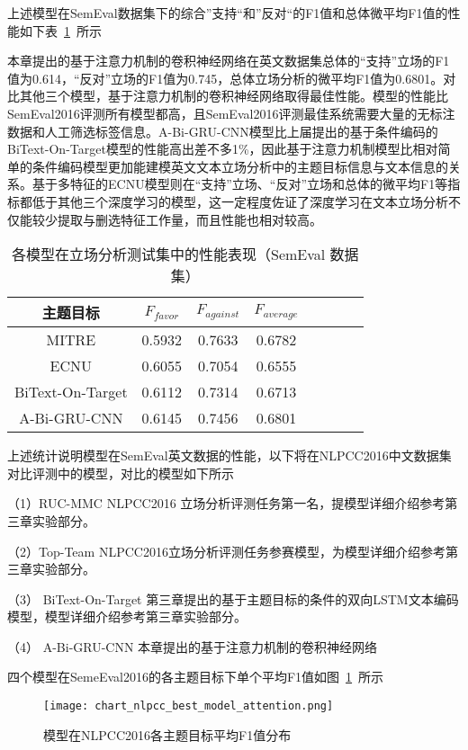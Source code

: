 上述模型在SemEval数据集下的综合”支持“和”反对“的F1值和总体微平均F1值的性能如下表~\ref{semeval_attention_res}~所示


本章提出的基于注意力机制的卷积神经网络在英文数据集总体的“支持”立场的F1值为0.614，“反对”立场的F1值为0.745，总体立场分析的微平均F1值为0.6801。对比其他三个模型，基于注意力机制的卷积神经网络取得最佳性能。模型的性能比SemEval2016评测所有模型都高，且SemEval2016评测最佳系统需要大量的无标注数据和人工筛选标签信息。A-Bi-GRU-CNN模型比上届提出的基于条件编码的BiText-On-Target模型的性能高出差不多1\%，因此基于注意力机制模型比相对简单的条件编码模型更加能建模英文文本立场分析中的主题目标信息与文本信息的关系。基于多特征的ECNU模型则在“支持”立场、“反对”立场和总体的微平均F1等指标都低于其他三个深度学习的模型，这一定程度佐证了深度学习在文本立场分析不仅能较少提取与删选特征工作量，而且性能也相对较高。

\begin{table}[htbp]
	\caption[table123]{各模型在立场分析测试集中的性能表现（SemEval 数据集）}
	\vspace{0.5em}\centering\wuhao
	\label{semeval_attention_res}
	\begin{tabular}{cccccccc}
		\toprule[1.5pt]
		主题目标& $F_{favor}$&$F_{against}$&$F_{average}$ \\
		\midrule[1pt]
		MITRE&0.5932&0.7633&0.6782\\
		ECNU&0.6055&0.7054&0.6555\\
		BiText-On-Target&0.6112&0.7314&0.6713\\
			A-Bi-GRU-CNN&0.6145&0.7456&0.6801\\
		\bottomrule[1.5pt]
	\end{tabular}
\end{table}

上述统计说明模型在SemEval英文数据的性能，以下将在NLPCC2016中文数据集对比评测中的模型，对比的模型如下所示

（1）RUC-MMC NLPCC2016 立场分析评测任务第一名，提模型详细介绍参考第三章实验部分。

（2）Top-Team NLPCC2016立场分析评测任务参赛模型，为模型详细介绍参考第三章实验部分。

（3） BiText-On-Target 第三章提出的基于主题目标的条件的双向LSTM文本编码模型，模型详细介绍参考第三章实验部分。

（4） A-Bi-GRU-CNN 本章提出的基于注意力机制的卷积神经网络

四个模型在SemeEval2016的各主题目标下单个平均F1值如图~\ref{chart_nlpcc_best_model_attention}~所示
\begin{figure}[htbp]
	\centering
	\texttt{[image: chart\_nlpcc\_best\_model\_attention.png]}
	\caption[rnn_vanish]{模型在NLPCC2016各主题目标平均F1值分布}
	\label{chart_nlpcc_best_model_attention}
\end{figure}


